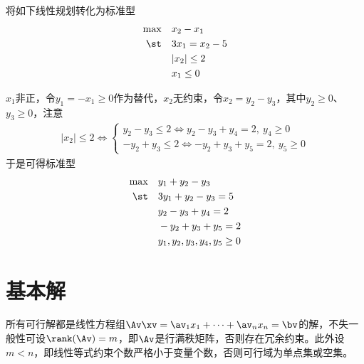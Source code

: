 \documentclass{ctexart}
\begin{document}
\begin{example}
    将如下线性规划转化为标准型
    \begin{align*}
        \max \quad & x_2 - x_1       \\
        \st  \quad & 3 x_1 = x_2 - 5 \\
                   & |x_2| \le 2     \\
                   & x_1 \le 0
    \end{align*}

    $x_1$非正，令$y_1 = -x_1 \ge 0$作为替代，$x_2$无约束，令$x_2 = y_2 - y_3$，其中$y_2 \ge 0 $、$y_3 \ge 0$，注意
    \begin{align*}
        |x_2| \le 2 \Longleftrightarrow
        \begin{cases}
            y_2 - y_3 \le 2 \Longleftrightarrow y_2 - y_3 + y_4 = 2, ~ y_4 \ge 0 \\
            -y_2 + y_3 \le 2 \Longleftrightarrow -y_2 + y_3 + y_5 = 2, ~ y_5 \ge 0
        \end{cases}
    \end{align*}
    于是可得标准型
    \begin{align*}
        \max \quad & y_1 + y_2 - y_3           \\
        \st  \quad & 3 y_1 + y_2 - y_3 = 5     \\
                   & y_2 - y_3 + y_4 = 2       \\
                   & -y_2 + y_3 + y_5 = 2      \\
                   & y_1,y_2,y_3,y_4,y_5 \ge 0
    \end{align*}
\end{example}

\section{基本解}

所有可行解都是线性方程组$\Av \xv = \av_1 x_1 + \cdots + \av_n x_n = \bv$的解，不失一般性可设$\rank(\Av) = m$，即$\Av$是行满秩矩阵，否则存在冗余约束。此外设$m < n$，即线性等式约束个数严格小于变量个数，否则可行域为单点集或空集。
\end{document}
